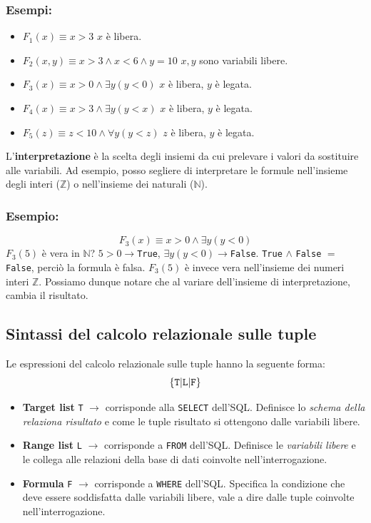 \documentclass{report}
\begin{document}
\subsubsection{Esempi:}
\begin{itemize}
\item $F_1(x) \equiv x>3$ $x$ \`e libera.
\item $F_2(x,y) \equiv x>3 \wedge x<6 \wedge y=10$ $x,y$ sono variabili libere.
\item $F_3(x) \equiv x > 0 \wedge \exists y(y<0)$ $x$ \`e libera, $y$ \`e legata.
\item $F_4(x) \equiv x>3 \wedge \exists y(y<x)$ $x$ \`e libera, $y$ \`e legata.
\item $F_5(z) \equiv z<10 \wedge \forall y(y<z)$ $z$ \`e libera, $y$ \`e legata.
\end{itemize}

L'\textbf{interpretazione} \`e la scelta degli insiemi da cui prelevare i valori da sostituire alle variabili. Ad esempio, posso segliere di interpretare le formule nell'insieme degli interi ($\mathbb{Z}$) o nell'insieme dei naturali ($\mathbb{N}$).

\subsubsection{Esempio:}
\[ F_3(x) \equiv x>0 \wedge \exists y(y<0) \]
$F_3(5)$ \`e vera in $\mathbb{N}$? $5 > 0 \to$\texttt{True}, $\exists y(y<0) \to$\texttt{False}. \texttt{True} $\wedge$ \texttt{False} $=$ \texttt{False}, perci\`o la formula \`e falsa.
$F_3(5)$ \`e invece vera nell'insieme dei numeri interi $\mathbb{Z}$. Possiamo dunque notare che al variare dell'insieme di interpretazione, cambia il risultato.
\newpage
\subsection{Sintassi del calcolo relazionale sulle tuple}

Le espressioni del calcolo relazionale sulle tuple hanno la seguente forma:
\[ \{ \text{\texttt{T}} | \text{\texttt{L}} | \text{\texttt{F}} \} \]
\begin{itemize}
\item \textbf{Target list} \texttt{T} $\to$ corrisponde alla \texttt{SELECT} dell'SQL. Definisce lo \emph{schema della relaziona risultato} e come le tuple risultato si ottengono dalle variabili libere.
\item \textbf{Range list} \texttt{L} $\to$ corrisponde a \texttt{FROM} dell'SQL. Definisce le \emph{variabili libere} e le collega alle relazioni della base di dati coinvolte nell'interrogazione.
\item \textbf{Formula} \texttt{F} $\to$ corrisponde a \texttt{WHERE} dell'SQL. Specifica la condizione che deve essere soddisfatta dalle variabili libere, vale a dire dalle tuple coinvolte nell'interrogazione.
\end{itemize}
\end{document}
